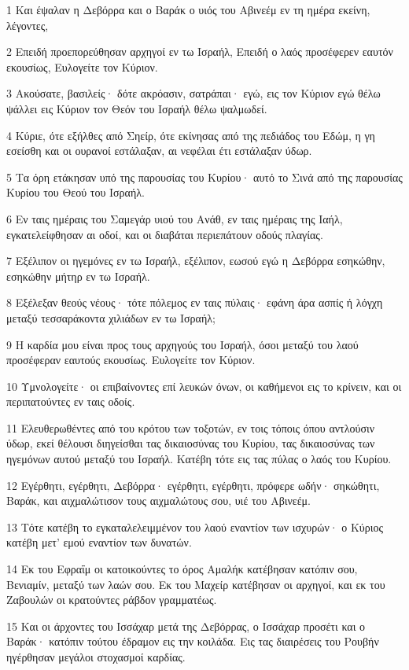\par 1 Και έψαλαν η Δεβόρρα και ο Βαράκ ο υιός του Αβινεέμ εν τη ημέρα εκείνη, λέγοντες,
\par 2 Επειδή προεπορεύθησαν αρχηγοί εν τω Ισραήλ, Επειδή ο λαός προσέφερεν εαυτόν εκουσίως, Ευλογείτε τον Κύριον.
\par 3 Ακούσατε, βασιλείς· δότε ακρόασιν, σατράπαι· εγώ, εις τον Κύριον εγώ θέλω ψάλλει εις Κύριον τον Θεόν του Ισραήλ θέλω ψαλμωδεί.
\par 4 Κύριε, ότε εξήλθες από Σηείρ, ότε εκίνησας από της πεδιάδος του Εδώμ, η γη εσείσθη και οι ουρανοί εστάλαξαν, αι νεφέλαι έτι εστάλαξαν ύδωρ.
\par 5 Τα όρη ετάκησαν υπό της παρουσίας του Κυρίου· αυτό το Σινά από της παρουσίας Κυρίου του Θεού του Ισραήλ.
\par 6 Εν ταις ημέραις του Σαμεγάρ υιού του Ανάθ, εν ταις ημέραις της Ιαήλ, εγκατελείφθησαν αι οδοί, και οι διαβάται περιεπάτουν οδούς πλαγίας.
\par 7 Εξέλιπον οι ηγεμόνες εν τω Ισραήλ, εξέλιπον, εωσού εγώ η Δεβόρρα εσηκώθην, εσηκώθην μήτηρ εν τω Ισραήλ.
\par 8 Εξέλεξαν θεούς νέους· τότε πόλεμος εν ταις πύλαις· εφάνη άρα ασπίς ή λόγχη μεταξύ τεσσαράκοντα χιλιάδων εν τω Ισραήλ;
\par 9 Η καρδία μου είναι προς τους αρχηγούς του Ισραήλ, όσοι μεταξύ του λαού προσέφεραν εαυτούς εκουσίως. Ευλογείτε τον Κύριον.
\par 10 Υμνολογείτε· οι επιβαίνοντες επί λευκών όνων, οι καθήμενοι εις το κρίνειν, και οι περιπατούντες εν ταις οδοίς.
\par 11 Ελευθερωθέντες από του κρότου των τοξοτών, εν τοις τόποις όπου αντλούσιν ύδωρ, εκεί θέλουσι διηγείσθαι τας δικαιοσύνας του Κυρίου, τας δικαιοσύνας των ηγεμόνων αυτού μεταξύ του Ισραήλ. Κατέβη τότε εις τας πύλας ο λαός του Κυρίου.
\par 12 Εγέρθητι, εγέρθητι, Δεβόρρα· εγέρθητι, εγέρθητι, πρόφερε ωδήν· σηκώθητι, Βαράκ, και αιχμαλώτισον τους αιχμαλώτους σου, υιέ του Αβινεέμ.
\par 13 Τότε κατέβη το εγκαταλελειμμένον του λαού εναντίον των ισχυρών· ο Κύριος κατέβη μετ' εμού εναντίον των δυνατών.
\par 14 Εκ του Εφραΐμ οι κατοικούντες το όρος Αμαλήκ κατέβησαν κατόπιν σου, Βενιαμίν, μεταξύ των λαών σου. Εκ του Μαχείρ κατέβησαν οι αρχηγοί, και εκ του Ζαβουλών οι κρατούντες ράβδον γραμματέως.
\par 15 Και οι άρχοντες του Ισσάχαρ μετά της Δεβόρρας, ο Ισσάχαρ προσέτι και ο Βαράκ· κατόπιν τούτου έδραμον εις την κοιλάδα. Εις τας διαιρέσεις του Ρουβήν ηγέρθησαν μεγάλοι στοχασμοί καρδίας.
